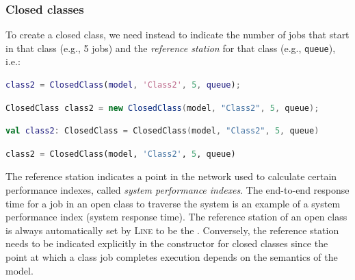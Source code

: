 \subsubsection{Closed classes}
To create a closed class, we need instead to indicate the number of jobs that start in that class (e.g., 5 jobs) and the {\em reference station} for that class (e.g., \texttt{queue}), i.e.:
\begin{MATLAB}
\begin{lstlisting}[language = matlab]
class2 = ClosedClass(model, 'Class2', 5, queue);
\end{lstlisting}
\end{MATLAB}
\begin{JAVA}
\begin{lstlisting}[language = java, basicstyle=\ttfamily\scriptsize]
ClosedClass class2 = new ClosedClass(model, "Class2", 5, queue);
\end{lstlisting}
\end{JAVA}
\begin{KOTLIN}
\begin{lstlisting}[language = kotlin, basicstyle=\ttfamily\scriptsize]
val class2: ClosedClass = ClosedClass(model, "Class2", 5, queue)
\end{lstlisting}
\end{KOTLIN}
\begin{PYTHON}
\begin{lstlisting}[language = python]
class2 = ClosedClass(model, 'Class2', 5, queue)
\end{lstlisting}
\end{PYTHON}
The reference station indicates a point in the network used to calculate certain performance indexes, called {\em system performance indexes}. The end-to-end response time for a job in an open class to traverse the system is an example of a system performance index (system response time). The reference station of an open class is always automatically set by \textsc{Line} to be the . Conversely, the reference station needs to be indicated explicitly in the constructor for closed classes since the point at which a class job completes execution depends on the semantics of the model.

